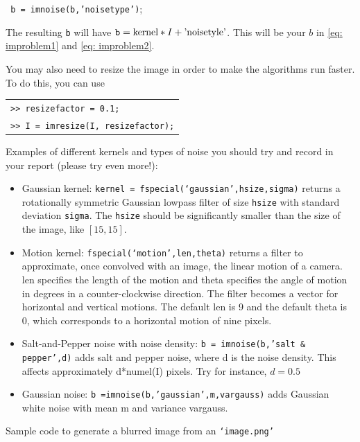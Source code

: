 \documentclass[12pt]{article}
\begin{document}
\begin{itemize}
\texttt{ \hspace{2cm} b = imnoise(b,'noisetype')};

The resulting \texttt{b} will have $\text{\texttt{b}} = \text{kernel} * I + \text{'noisetyle'}$. This will be your $b$ in \eqref{eq: improblem1} and \eqref{eq: improblem2}.

You may also need to resize the image in order to make the algorithms run faster. To do this, you can use 

\begin{tabular}{l}
\texttt{>> resizefactor = 0.1;}\\
\texttt{>> I = imresize(I, resizefactor);}
\end{tabular}

Examples of different kernels and types of noise you should try and record in your report (please try even more!):
\begin{itemize}
\item Gaussian kernel: \texttt{kernel = fspecial(`gaussian',hsize,sigma)} returns a rotationally symmetric Gaussian lowpass filter of size \texttt{hsize} with standard deviation \texttt{sigma}. The \texttt{hsize} should be significantly smaller than the size of the image, like $[15,15]$.
\item Motion kernel: \texttt{fspecial(`motion',len,theta)} returns a filter to approximate, once convolved with an image, the linear motion of a camera. len specifies the length of the motion and theta specifies the angle of motion in degrees in a counter-clockwise direction. The filter becomes a vector for horizontal and vertical motions. The default len is 9 and the default theta is 0, which corresponds to a horizontal motion of nine pixels.
\item Salt-and-Pepper noise with noise density: \texttt{b = imnoise(b,'salt \& pepper',d)} adds salt and pepper noise, where d is the noise density. This affects approximately d*numel(I) pixels. Try for instance, $d = 0.5$
\item Gaussian noise: \texttt{b =imnoise(b,'gaussian',m,vargauss)} adds Gaussian white noise with mean m and variance vargauss.
\end{itemize}
Sample code to generate a blurred image from an \texttt{`image.png'}


\end{itemize}
\end{document}
